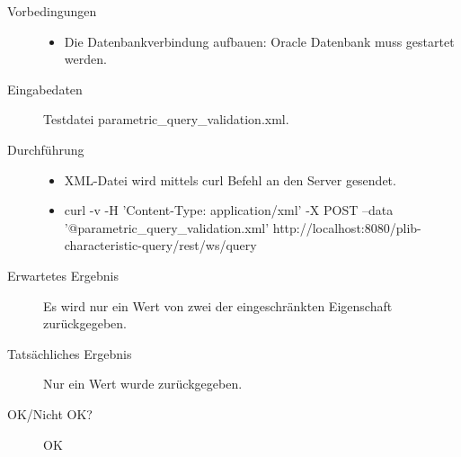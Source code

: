 \begin{description}
\item[Vorbedingungen] 
  \begin{itemize}
   \item Die Datenbankverbindung aufbauen: Oracle Datenbank muss gestartet werden.
  \end{itemize}
\item[Eingabedaten] Testdatei parametric\_query\_validation.xml. 
\item[Durchführung]
   \begin{itemize}
   \item XML-Datei wird mittels curl Befehl an den Server gesendet.
   \item curl -v -H 'Content-Type: application/xml' -X POST --data '@parametric\_query\_validation.xml' http://localhost:8080/plib-characteristic-query/rest/ws/query
  \end{itemize}
\item[Erwartetes Ergebnis] Es wird nur ein Wert von zwei der eingeschränkten Eigenschaft zurückgegeben.  
\item[Tatsächliches Ergebnis] Nur ein Wert wurde zurückgegeben. 
\item[OK/Nicht OK?] OK
\end{description}

